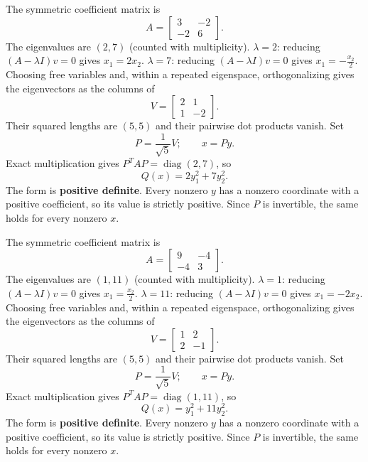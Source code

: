 The symmetric coefficient matrix is
\[
 A=\begin{bmatrix}3&-2\\-2&6\end{bmatrix}.
\]
The eigenvalues are $(2,7)$ (counted with multiplicity).
$\lambda=2$: reducing $(A-\lambda I)v=0$ gives
\( x_{1}=2 x_{2} \).
$\lambda=7$: reducing $(A-\lambda I)v=0$ gives
\( x_{1}=- \frac{x_{2}}{2} \).
Choosing free variables and, within a repeated eigenspace, orthogonalizing
gives the eigenvectors as the columns of
\[
 V=\begin{bmatrix}2&1\\1&-2\end{bmatrix}.
\]
Their squared lengths are $(5,5)$ and their pairwise dot products vanish. Set
\[
 P=\frac1{\sqrt{5}}V;\qquad x=Py.
\]
Exact multiplication gives $P^TAP=\operatorname{diag}(2,7)$, so
\[
 Q(x)=\boxed{2 y_{1}^{2} + 7 y_{2}^{2}}.
\]
The form is \textbf{positive definite}. Every nonzero $y$ has a nonzero coordinate with a positive coefficient,
so its value is strictly positive. Since $P$ is invertible, the same holds
for every nonzero $x$.

The symmetric coefficient matrix is
\[
 A=\begin{bmatrix}9&-4\\-4&3\end{bmatrix}.
\]
The eigenvalues are $(1,11)$ (counted with multiplicity).
$\lambda=1$: reducing $(A-\lambda I)v=0$ gives
\( x_{1}=\frac{x_{2}}{2} \).
$\lambda=11$: reducing $(A-\lambda I)v=0$ gives
\( x_{1}=- 2 x_{2} \).
Choosing free variables and, within a repeated eigenspace, orthogonalizing
gives the eigenvectors as the columns of
\[
 V=\begin{bmatrix}1&2\\2&-1\end{bmatrix}.
\]
Their squared lengths are $(5,5)$ and their pairwise dot products vanish. Set
\[
 P=\frac1{\sqrt{5}}V;\qquad x=Py.
\]
Exact multiplication gives $P^TAP=\operatorname{diag}(1,11)$, so
\[
 Q(x)=\boxed{y_{1}^{2} + 11 y_{2}^{2}}.
\]
The form is \textbf{positive definite}. Every nonzero $y$ has a nonzero coordinate with a positive coefficient,
so its value is strictly positive. Since $P$ is invertible, the same holds
for every nonzero $x$.

